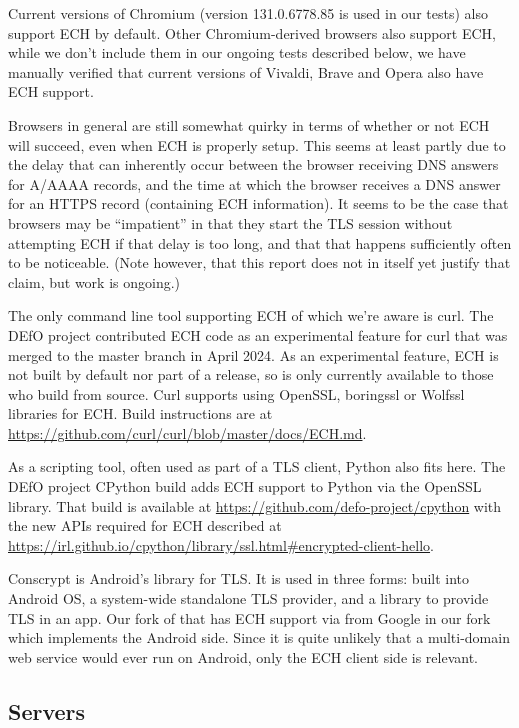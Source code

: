 Current versions of Chromium (version 131.0.6778.85 is used in our tests)
also support ECH by default.
Other Chromium-derived browsers also support ECH, while we don't include them
in our ongoing tests described below, we have manually verified that current
versions of Vivaldi, Brave and Opera also have ECH support.

Browsers in general are still somewhat quirky in terms of whether or not
ECH will succeed, even when ECH is properly setup. This seems at least
partly due to the delay that can inherently occur between the browser
receiving DNS answers for A/AAAA records, and the time at which the
browser receives a DNS answer for an HTTPS record (containing ECH
information). It seems to be the case that browsers may be ``impatient''
in that they start the TLS session without attempting ECH if that
delay is too long, and that that happens sufficiently often to be
noticeable. (Note however, that this report does not in itself yet
justify that claim, but work is ongoing.)

The only command line tool supporting ECH of which we're aware is curl. The
DEfO project
contributed ECH code as an experimental feature for curl that was merged to the
master branch in April 2024. As an experimental feature, ECH is not built by
default nor part of a release, so is only currently available to those who
build from source. Curl supports using OpenSSL, boringssl or Wolfssl libraries
for ECH.  Build instructions are at
\url{https://github.com/curl/curl/blob/master/docs/ECH.md}.

As a scripting tool, often used as part of a TLS client, Python also fits here.
The DEfO project CPython build adds ECH support to Python via the OpenSSL
library.  That build is available at
\url{https://github.com/defo-project/cpython} with the new APIs required for
ECH described at
\url{https://irl.github.io/cpython/library/ssl.html#encrypted-client-hello}.

Conscrypt is Android's library for TLS. It is used in three forms: built into
Android OS, a system-wide standalone TLS provider, and a library to provide TLS
in an app. Our fork of that has ECH support via from Google in our fork
which implements the Android side. Since it is quite unlikely that a
multi-domain web service would ever run on Android, only the ECH client side is
relevant.

\subsection{Servers}

